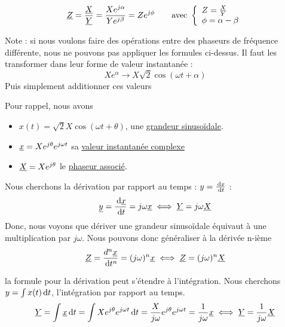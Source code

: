 \documentclass[12pt,a4paper]{article}
\newcommand{\uz}{\uline{Z} }
\newcommand{\ux}{\uline{X} }
\newcommand{\uy}{\uline{Y} }
\begin{document}
\begin{boite}
	\begin{equation}
		\uz = \frac{\ux}{\uy} =\frac{Xe^{j\alpha}}{Ye^{j\beta}} = Ze^{j\phi} \qquad \text{avec } 
		\left\{\begin{array}{l}
			Z = \frac{X}{Y}\\
			\phi = \alpha - \beta
		\end{array}\right.
	\end{equation}
\end{boite} 
\begin{blackbox}
	Note : si nous voulons faire des opérations entre des phaseurs de fréquence différente, nous ne pouvons pas appliquer les formules ci-dessus. Il faut les transformer dans leur forme de valeur instantanée :
	\[Xe^{\alpha} \to X\sqrt{2}\cos(\omega t + \alpha)\]
	Puis simplement additionner ces valeurs
\end{blackbox}
Pour rappel, nous avons 
\begin{itemize}
	\item 	$x(t) = \sqrt{2}X\cos(\omega t + \theta)$, une \uline{grandeur sinusoïdale}. 
	\item 	$\uline{x} = Xe^{j\theta}e^{j\omega t}$ sa  \uline{valeur instantanée complexe}
	\item 	$\ux = Xe^{j\theta}$ le \uline{phaseur associé}. 
\end{itemize}
\begin{boite}
	 Nous cherchons la dérivation par rapport au temps : $y = \frac{\, \mathrm d x}{\, \mathrm d t}$ :
	\begin{equation}
		\uline{y} = \frac{\deriv{\uline{x}}}{\deriv{t}} = j\omega \uline{x} \iff \uy = j\omega \ux
	\end{equation}
	Donc, nous voyons que dériver une grandeur sinusoïdale équivaut à une multiplication par $j\omega$. Nous pouvons donc généraliser à la dérivée n-ième
	\begin{equation}
		\uz = \frac{d^n{\uline{x}}}{\deriv{t^n}} = (j\omega)^n \uline{x} \iff \uz = (j\omega)^n \ux
	\end{equation}
\end{boite}
\begin{boite}
	 la formule pour la dérivation peut s'étendre à l'intégration. Nous cherchons $y = \int x(t) \, \mathrm d t$, l'intégration par rapport au temps.
	\begin{equation}
		\uy = \int \uline{x}\deriv{t} = \int Xe^{j\theta}e^{j\omega t} \deriv{t} = \frac{X}{j\omega}e^{j\theta}e^{j\omega t} = \frac{1}{j\omega}\uline{x} \iff \uy = \frac{1}{j\omega}\ux
	\end{equation}
\end{boite}
\end{document}
